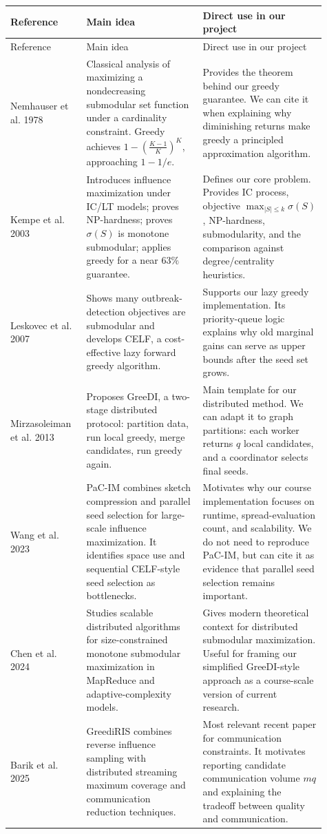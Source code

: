 \documentclass[10pt]{article}
\begin{document}
\begin{longtable}{p{0.21\linewidth}p{0.34\linewidth}p{0.36\linewidth}}
\toprule
Reference & Main idea & Direct use in our project \\
\midrule
\endfirsthead
\toprule
Reference & Main idea & Direct use in our project \\
\midrule
\endhead
Nemhauser et al. 1978 & Classical analysis of maximizing a nondecreasing
submodular set function under a cardinality constraint. Greedy achieves
$1-\left(\frac{K-1}{K}\right)^K$, approaching $1-1/e$. &
Provides the theorem behind our greedy guarantee. We can cite it when explaining
why diminishing returns make greedy a principled approximation algorithm. \\
\midrule
Kempe et al. 2003 & Introduces influence maximization under IC/LT models;
proves NP-hardness; proves $\sigma(S)$ is monotone submodular; applies greedy
for a near $63\%$ guarantee. &
Defines our core problem. Provides IC process, objective $\max_{|S|\le k}\sigma(S)$,
NP-hardness, submodularity, and the comparison against degree/centrality
heuristics. \\
\midrule
Leskovec et al. 2007 & Shows many outbreak-detection objectives are submodular
and develops CELF, a cost-effective lazy forward greedy algorithm. &
Supports our lazy greedy implementation. Its priority-queue logic explains why
old marginal gains can serve as upper bounds after the seed set grows. \\
\midrule
Mirzasoleiman et al. 2013 & Proposes GreeDI, a two-stage distributed protocol:
partition data, run local greedy, merge candidates, run greedy again. &
Main template for our distributed method. We can adapt it to graph partitions:
each worker returns $q$ local candidates, and a coordinator selects final seeds. \\
\midrule
Wang et al. 2023 & PaC-IM combines sketch compression and parallel seed
selection for large-scale influence maximization. It identifies space use and
sequential CELF-style seed selection as bottlenecks. &
Motivates why our course implementation focuses on runtime, spread-evaluation
count, and scalability. We do not need to reproduce PaC-IM, but can cite it as
evidence that parallel seed selection remains important. \\
\midrule
Chen et al. 2024 & Studies scalable distributed algorithms for size-constrained
monotone submodular maximization in MapReduce and adaptive-complexity models. &
Gives modern theoretical context for distributed submodular maximization. Useful
for framing our simplified GreeDI-style approach as a course-scale version of
current research. \\
\midrule
Barik et al. 2025 & GreediRIS combines reverse influence sampling with
distributed streaming maximum coverage and communication reduction techniques. &
Most relevant recent paper for communication constraints. It motivates reporting
candidate communication volume $mq$ and explaining the tradeoff between quality
and communication. \\
\bottomrule
\end{longtable}
\end{document}
